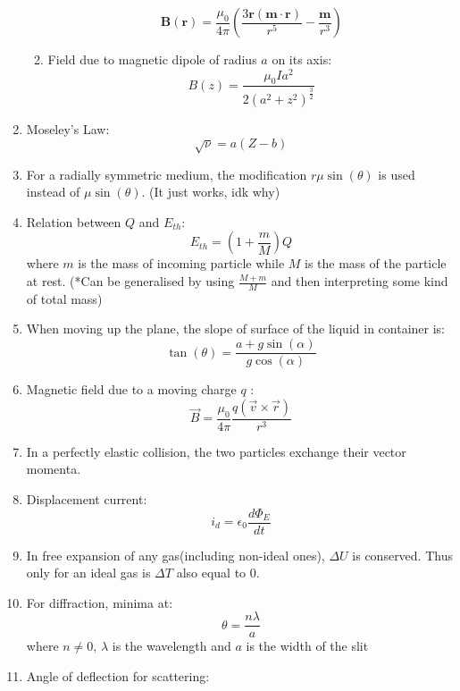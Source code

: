 \documentclass{article}
\numberwithin{equation}{section}
\numberwithin{figure}{section}
\newcommand{\Cr}{\times}
\begin{document}
\begin{enumerate}
\begin{enumerate}
\begin{equation}
					\mathbf{B(r)}=\frac{\mu_0}{4\pi}\left(\frac{3\mathbf{r(m\cdot r)}}{r^5}-\frac{\mathbf{m}}{r^3}\right)
				\end{equation}
			\item Field due to magnetic dipole of radius $a$ on its axis:
				\begin{equation}
					B(z)=\frac{\mu_0 I a^2}{2 (a^2+z^2)^{\frac{3}{2}}}
				\end{equation}
		\end{enumerate}
	\item Moseley's Law:
		\begin{equation}
			\sqrt{\nu}=a(Z-b)
		\end{equation}
	\item For a radially symmetric medium, the modification $r \mu \sin(\theta)$ is used instead of $\mu \sin(\theta)$. (It just works, idk why)
	\item Relation between $Q$ and $E_{th}$:
		\begin{equation}
			E_{th}=\left(1+\frac{m}{M}\right) Q
		\end{equation}
		where $m$ is the mass of incoming particle while $M$ is the mass of the particle at rest. (*Can be generalised by using $\frac{M+m}{M}$ and then interpreting some kind of total mass)
	\item When moving up the plane, the slope of surface of the liquid in container is:
		\begin{equation}
			\tan(\theta)=\frac{a+g \sin(\alpha)}{g\cos(\alpha)}
		\end{equation}
	\item Magnetic field due to a moving charge $q$ :
		\begin{equation}
			\vec{B}=\frac{\mu_0}{4\pi}\frac{q(\vec{v}\Cr\vec{r})}{r^3}
		\end{equation}
	\item In a perfectly elastic collision, the two particles exchange their vector momenta.
	\item Displacement current:
		\begin{equation}
			i_d=\epsilon_0 \frac{d\Phi_E}{dt}
		\end{equation}
	\item In free expansion of any gas(including non-ideal ones), $\Delta U$ is conserved. Thus only for an ideal gas is $\Delta T$ also equal to $0$.
	\item For diffraction, minima at: $$\theta=\frac{n\lambda}{a}$$
		where $n\neq 0$, $\lambda$ is the wavelength and $a$ is the width of the slit
	\item Angle of deflection for scattering:

\end{enumerate}
\end{document}
